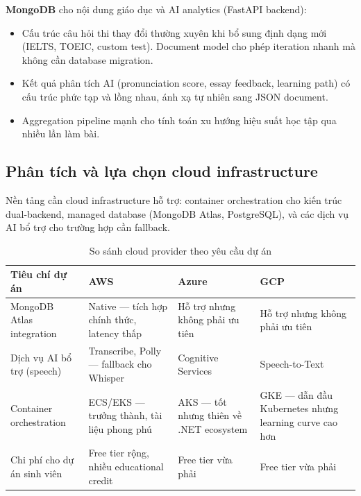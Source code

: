 \textbf{MongoDB} cho nội dung giáo dục và AI analytics (FastAPI backend):
\begin{itemize}
\item Cấu trúc câu hỏi thi thay đổi thường xuyên khi bổ sung định dạng mới (IELTS, TOEIC, custom test). Document model cho phép iteration nhanh mà không cần database migration.
\item Kết quả phân tích AI (pronunciation score, essay feedback, learning path) có cấu trúc phức tạp và lồng nhau, ánh xạ tự nhiên sang JSON document.
\item Aggregation pipeline mạnh cho tính toán xu hướng hiệu suất học tập qua nhiều lần làm bài. \cite{mongodb}
\end{itemize}

\subsection{Phân tích và lựa chọn cloud infrastructure}

Nền tảng cần cloud infrastructure hỗ trợ: container orchestration cho kiến trúc dual-backend, managed database (MongoDB Atlas, PostgreSQL), và các dịch vụ AI bổ trợ cho trường hợp cần fallback.

\begin{table}[ht]
    \centering
    \scriptsize
    \caption{So sánh cloud provider theo yêu cầu dự án}
    \label{tab:cloud_comp}
    \begin{tabular}{|p{3cm}|p{4cm}|p{4cm}|p{3.5cm}|}
        \hline
        \textbf{Tiêu chí dự án} & \textbf{AWS} & \textbf{Azure} & \textbf{GCP} \\
        \hline
        MongoDB Atlas integration & Native --- tích hợp chính thức, latency thấp & Hỗ trợ nhưng không phải ưu tiên & Hỗ trợ nhưng không phải ưu tiên \\
        \hline
        Dịch vụ AI bổ trợ (speech) & Transcribe, Polly --- fallback cho Whisper & Cognitive Services & Speech-to-Text \\
        \hline
        Container orchestration & ECS/EKS --- trưởng thành, tài liệu phong phú & AKS --- tốt nhưng thiên về .NET ecosystem & GKE --- dẫn đầu Kubernetes nhưng learning curve cao hơn \\
        \hline
        Chi phí cho dự án sinh viên & Free tier rộng, nhiều educational credit & Free tier vừa phải & Free tier vừa phải \\
        \hline
    \end{tabular}
\end{table}

